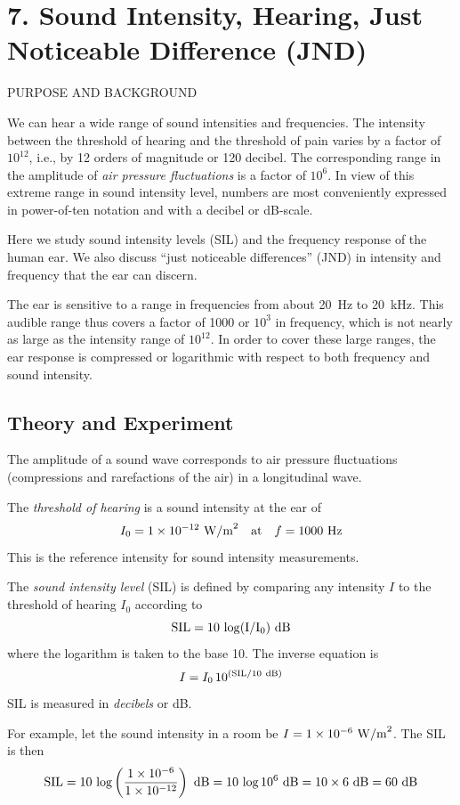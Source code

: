 \documentclass[11pt]{NSF}
\def\be{\begin{equation}}
\def\ee{\end{equation}}
\begin{document}
\section{7. Sound Intensity, Hearing, Just Noticeable Difference (JND)} 

PURPOSE AND BACKGROUND

We can hear a wide range of sound intensities and frequencies. The
intensity between the threshold of hearing and the threshold of pain
varies by a factor of $10^{12}$, i.e., by 12 orders of magnitude or 120
decibel. The corresponding range in the amplitude of {\em air pressure 
fluctuations} is a factor of $10^6$. 
In view of this extreme range in sound intensity level, 
numbers are most conveniently expressed in power-of-ten
notation and with a decibel or dB-scale.  

Here we study sound intensity levels (SIL) and the frequency response of
the human ear. We also discuss ``just noticeable differences” (JND) in
intensity and frequency that the ear can discern.  

The ear is sensitive to a range in frequencies from about 20~Hz to 20~kHz.  
This audible range thus covers a factor of 1000 or $10^3$ in frequency, 
which is not nearly as large as the intensity range of $10^{12}$.  
In order to cover these large ranges, the ear
response is compressed or logarithmic with respect to both frequency
and sound intensity.

\subsection{Theory and Experiment}

The amplitude of a sound wave corresponds to air pressure fluctuations
(compressions and rarefactions of the air) in a longitudinal wave.

The {\em threshold of hearing} is a sound intensity at the ear of 
%
\be
I_0=1\times 10^{-12}~\textrm{W/m}^2
\quad{\rm at}\quad
f = 1000~\textrm{Hz}
\ee
%
This is the reference intensity for sound intensity measurements.
 
The {\em sound intensity level} (SIL) is defined by comparing
any intensity $I$ to the threshold of hearing $I_0$ 
according to 
%
\be
\rm{SIL} = 10\,\log({I}/{I_0})~{\rm dB}
\label{e:SIL}
\ee
%
where the logarithm is taken to the base 10.
The inverse equation is
%
\be
I=I_0\,10^{({\rm SIL}/10~{\rm dB})}
\label{e:inverse}
\ee
%
SIL is measured in {\em decibels} or dB.

For example, let the sound intensity in a room be 
$I = 1\times 10^{-6}~{\rm W/m}^2$. 
The SIL is then 
\be
\rm{SIL} 
= 10\,\log\left(\frac{1\times 10^{-6}}{1\times 10^{-12}}\right)~{\rm dB}
=10\, \log 10^6~{\rm dB} = 10\times 6~{\rm dB} = 60~{\rm dB}
\ee
\end{document}
